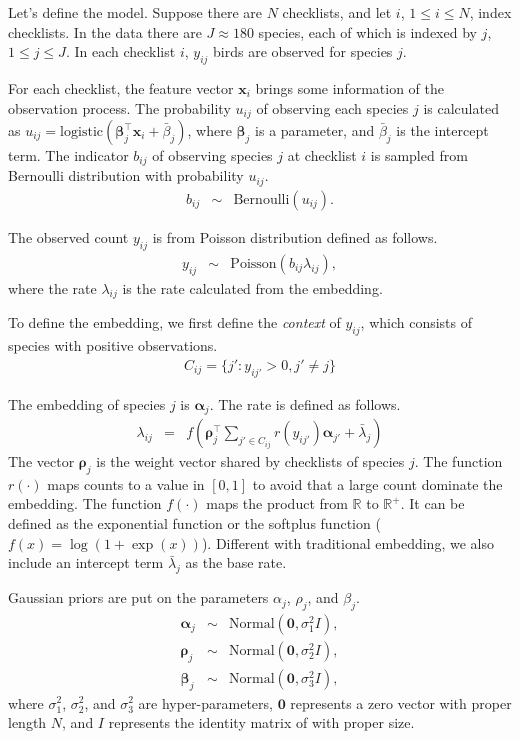 \documentclass{article}
\newcommand{\wt}{\boldsymbol{\rho}}
\newcommand{\obswt}{\boldsymbol{\beta}}
\newcommand{\emb}{\boldsymbol{\alpha}}
\begin{document}
Let's define the model. Suppose there are $N$ checklists, and let $i$, $1 \le i \le N$, index checklists. In the data there are $J \approx 180$ species, each of which is indexed by $j$, $1 \le j \le J$.  
In each checklist $i$, $y_{ij}$ birds are observed for species $j$. 

For each checklist, the feature vector $\mathbf{x}_{i}$ brings some information of the observation process. The probability $u_{ij}$ of observing each species $j$ is calculated as $u_{ij} = \mathrm{logistic}(\obswt_j^\top \mathbf{x}_i + \bar{\beta}_j)$, where $\obswt_j$ is a parameter, and $\bar{\beta}_j$ is the intercept term. The indicator $b_{ij}$ of observing species $j$ at checklist $i$ is sampled from Bernoulli distribution with probability $u_{ij}$. 
\begin{eqnarray}
b_{ij} &\sim& \mathrm{Bernoulli}(u_{ij}).
\end{eqnarray}

The observed count $y_{ij}$ is from Poisson distribution defined as follows. 
\begin{eqnarray}
y_{ij} &\sim& \mathrm{Poisson}(b_{ij} \lambda_{ij}),
\end{eqnarray}
where the rate $\lambda_{ij}$ is the rate calculated from the embedding. 

To define the embedding, we first define the {\it context} of $y_{ij}$, which consists of species with positive observations. 
\begin{eqnarray}
C_{ij} = \{j': y_{ij'} > 0, j' \neq j\}
\end{eqnarray}

The embedding of species $j$ is $\emb_j$. The rate is defined as follows. 
\begin{eqnarray}
\lambda_{ij} &=& f\left(\wt_{j}^\top \sum_{j' \in C_{ij}} r(y_{ij'}) \emb_{j'} + \bar{\lambda}_{j} \right) \label{lambda_exp} 
\end{eqnarray}
The vector $\wt_j$ is the weight vector shared by checklists of species $j$. The function $r(\cdot)$ maps counts to a value in $[0, 1]$ to avoid that a large count dominate the embedding. The function $f(\cdot)$ maps the product from $\mathbb{R}$ to $\mathbb{R}^{+}$. It can be defined as the exponential function or the softplus function ($f(x) = \log(1 + \exp(x))$). Different with traditional embedding, we also include an intercept term $\bar{\lambda}_{j}$ as the base rate.

Gaussian priors are put on the parameters $\alpha_j$, $\rho_j$, and $\beta_j$. 
\begin{eqnarray}
\emb_j &\sim& \mathrm{Normal}(\mathbf{0}, \sigma^2_1 I), \\
\wt_j &\sim& \mathrm{Normal}(\mathbf{0}, \sigma^2_2 I), \\
\obswt_j &\sim& \mathrm{Normal}(\mathbf{0}, \sigma^2_3 I),
\end{eqnarray}
where $\sigma_1^2$, $\sigma_2^2$, and $\sigma_3^2$ are hyper-parameters, $\mathbf{0}$ represents a zero vector with proper length $N$, and $I$ represents the identity matrix of with proper size. 
\end{document}
